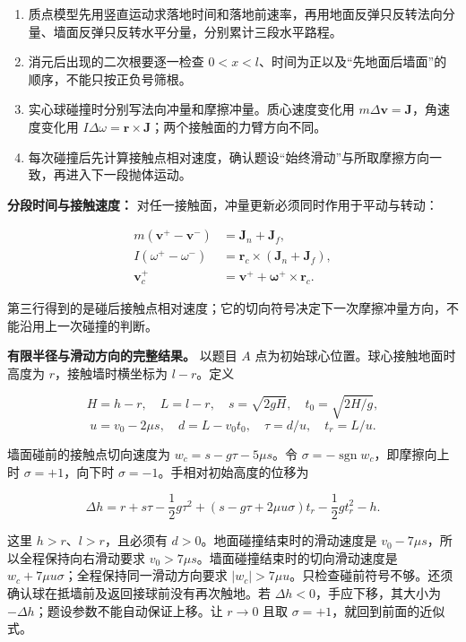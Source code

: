 \documentclass[12pt,a4paper,UTF8]{ctexart}
\newcommand{\tightlist}{\setlength{\itemsep}{0pt}\setlength{\parskip}{0pt}}
\begin{document}
\begin{enumerate}
\def\labelenumi{\arabic{enumi}.}
\tightlist
\item
  质点模型先用竖直运动求落地时间和落地前速率，再用地面反弹只反转法向分量、墙面反弹只反转水平分量，分别累计三段水平路程。
\item
  消元后出现的二次根要逐一检查
  \(0<x<l\)、时间为正以及``先地面后墙面''的顺序，不能只按正负号筛根。
\item
  实心球碰撞时分别写法向冲量和摩擦冲量。质心速度变化用
  \(m\Delta\boldsymbol v=\boldsymbol J\)，角速度变化用
  \(I\Delta\omega=\boldsymbol r\times\boldsymbol J\)；两个接触面的力臂方向不同。
\item
  每次碰撞后先计算接触点相对速度，确认题设``始终滑动''与所取摩擦方向一致，再进入下一段抛体运动。
\end{enumerate}

\textbf{分段时间与接触速度：}
对任一接触面，冲量更新必须同时作用于平动与转动：

\[\begin{aligned}
m(\boldsymbol v^+-\boldsymbol v^-)&=\boldsymbol J_n+\boldsymbol J_f,\\
I(\omega^+-\omega^-)&=
\boldsymbol r_c\times(\boldsymbol J_n+\boldsymbol J_f),\\
\boldsymbol v_c^+&=\boldsymbol v^+
+\boldsymbol\omega^+\times\boldsymbol r_c.
\end{aligned}\]

第三行得到的是碰后接触点相对速度；它的切向符号决定下一次摩擦冲量方向，不能沿用上一次碰撞的判断。

\textbf{有限半径与滑动方向的完整结果。} 以题目 \(A\)
点为初始球心位置。球心接触地面时高度为 \(r\)，接触墙时横坐标为
\(l-r\)。定义

\[H=h-r,\quad L=l-r,\quad s=\sqrt{2gH},\quad t_0=\sqrt{2H/g},\]
\[u=v_0-2\mu s,\quad d=L-v_0t_0,\quad \tau=d/u,\quad t_r=L/u.\]

墙面碰前的接触点切向速度为 \(w_c=s-g\tau-5\mu s\)。令
\(\sigma=-\operatorname{sgn}w_c\)，即摩擦向上时 \(\sigma=+1\)，向下时
\(\sigma=-1\)。手相对初始高度的位移为

\[\boxed{\Delta h=r+s\tau-\frac12g\tau^2+(s-g\tau+2\mu u\sigma)t_r-\frac12gt_r^2-h.}\]

这里 \(h>r\)、\(l>r\)，且必须有 \(d>0\)。地面碰撞结束时的滑动速度是
\(v_0-7\mu s\)，所以全程保持向右滑动要求
\(v_0>7\mu s\)。墙面碰撞结束时的切向滑动速度是
\(w_c+7\mu u\sigma\)；全程保持同一滑动方向要求
\(|w_c|>7\mu u\)。只检查碰前符号不够。还须确认球在抵墙前及返回接球前没有再次触地。若
\(\Delta h<0\)，手应下移，其大小为
\(-\Delta h\)；题设参数不能自动保证上移。让 \(r\to0\) 且取
\(\sigma=+1\)，就回到前面的近似式。
\end{document}
